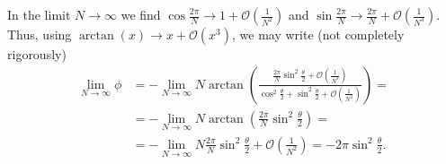 \documentclass[english, parskip=full]{scrartcl}
\newcommand{\kla}{}
\begin{document}
In the limit $N\rightarrow\infty$ we find $\cos\frac{2\pi}{N}\rightarrow 1 + \mathcal{O}\kla\left( \frac{1}{N^2} \right)$ and $\sin\frac{2\pi}{N}\rightarrow \frac{2\pi}{N} + \mathcal{O}\kla\left( \frac{1}{N^3} \right)$.
Thus, using $\arctan(x) \rightarrow x + \mathcal{O}(x^3)$, we may write (not completely rigorously)
\begin{align}
\lim_{N\rightarrow\infty} \phi &= -\lim_{N\rightarrow\infty}N\arctan\kla\left( \frac{\frac{2\pi }{N}\sin^2\frac{\theta}{2} + \mathcal{O}\kla\left( \frac{1}{N^3} \right)}{\cos^2\frac{\theta}{2} + \sin^2\frac{\theta}{2} + \mathcal{O}\kla\left( \frac{1}{N^2} \right)} \right) = \\
&= -\lim_{N\rightarrow\infty} N\arctan\kla\left( \frac{2\pi}{N}\sin^2\frac{\theta}{2} \right) = \\
&= -\lim_{N\rightarrow\infty} N \frac{2\pi}{N}\sin^2\frac{\theta}{2} + \mathcal{O}\kla\left( \frac{1}{N^2} \right) = -2\pi\sin^2\frac{\theta}{2}.
\end{align}
\end{document}
